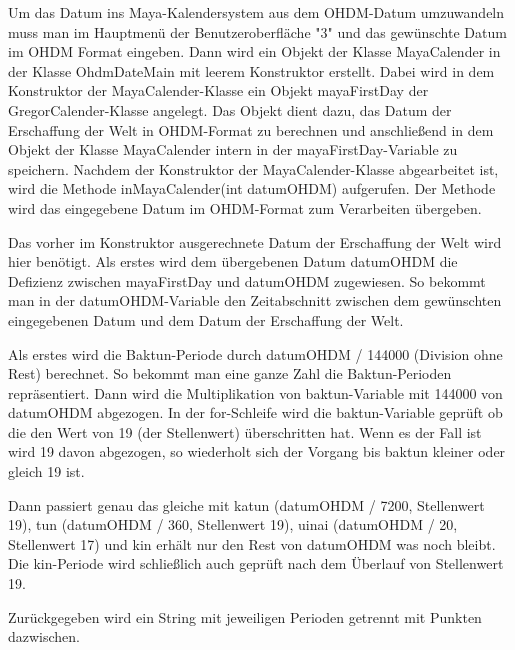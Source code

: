 \documentclass[]{article}
\begin{document}
Um das Datum ins Maya-Kalendersystem aus dem OHDM-Datum umzuwandeln muss man im Hauptmenü der Benutzeroberfläche "3" und das gewünschte Datum im OHDM Format eingeben. Dann wird ein Objekt der Klasse MayaCalender in der Klasse OhdmDateMain mit leerem Konstruktor erstellt. Dabei wird in dem Konstruktor der MayaCalender-Klasse ein Objekt mayaFirstDay der GregorCalender-Klasse angelegt. Das Objekt dient dazu, das Datum der Erschaffung der Welt in OHDM-Format zu berechnen und anschließend in dem Objekt der Klasse MayaCalender intern in der mayaFirstDay-Variable zu speichern. Nachdem der Konstruktor der MayaCalender-Klasse abgearbeitet ist, wird die Methode inMayaCalender(int datumOHDM) aufgerufen. Der Methode wird das eingegebene Datum im OHDM-Format zum Verarbeiten übergeben.

Das vorher im Konstruktor ausgerechnete Datum der Erschaffung der Welt wird hier benötigt. Als erstes wird dem übergebenen Datum datumOHDM die Defizienz zwischen mayaFirstDay und datumOHDM zugewiesen. So bekommt man in der datumOHDM-Variable den Zeitabschnitt zwischen dem gewünschten eingegebenen Datum und dem Datum der Erschaffung der Welt.

Als erstes wird die Baktun-Periode durch datumOHDM / 144000 (Division ohne Rest) berechnet. So bekommt man eine ganze Zahl die Baktun-Perioden repräsentiert. Dann wird die Multiplikation von baktun-Variable mit 144000 von datumOHDM abgezogen. In der for-Schleife wird die baktun-Variable geprüft ob die den Wert von 19 (der Stellenwert) überschritten hat. Wenn es der Fall ist wird 19 davon abgezogen, so wiederholt sich der Vorgang bis baktun kleiner oder gleich 19 ist.

Dann passiert genau das gleiche mit katun (datumOHDM / 7200, Stellenwert 19), tun (datumOHDM / 360, Stellenwert 19), uinai (datumOHDM / 20, Stellenwert 17) und kin erhält nur den Rest von datumOHDM was noch bleibt. Die kin-Periode wird schließlich auch geprüft nach dem Überlauf von Stellenwert 19.

Zurückgegeben wird ein String mit jeweiligen Perioden getrennt mit Punkten dazwischen.
\end{document}
